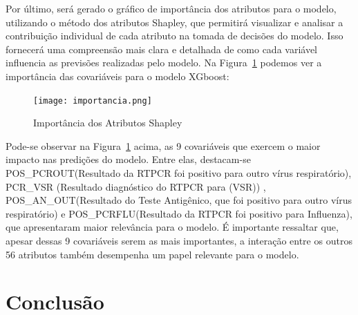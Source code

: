 \documentclass[12pt,oneside,a4paper,chapter=TITLE,
			   english,brazil]{abntex2}
\begin{document}
Por último, será gerado o gráfico de importância dos atributos para o modelo, utilizando o método dos atributos Shapley, que permitirá visualizar e analisar a contribuição individual de cada atributo na tomada de decisões do modelo. Isso fornecerá uma compreensão mais clara e detalhada de como cada variável influencia as previsões realizadas pelo modelo.  Na Figura~\ref{fig:Shaplay}  podemos ver a importância das covariáveis para o modelo XGboost:

 \begin{figure}[H]
  \centering

    \caption[Importância dos Atributos Shapley]{Importância dos Atributos Shapley} 
      \vspace{-0.75em}
  \texttt{[image: importancia.png]}

  \label{fig:Shaplay}
  \end{figure}
 \begin{flushleft}
\vspace{-1.9em}
\centering
{}
\end{flushleft}


 Pode-se observar na Figura~\ref{fig:Shaplay} acima, as 9 covariáveis que exercem o maior impacto nas predições do modelo. Entre elas, destacam-se POS\_PCROUT(Resultado da RTPCR foi positivo para outro vírus respiratório), PCR\_VSR (Resultado diagnóstico do RTPCR para (VSR))  , POS\_AN\_OUT(Resultado do Teste Antigênico, que foi positivo para outro vírus respiratório)  e  POS\_PCRFLU(Resultado da RTPCR foi positivo para Influenza), que apresentaram maior relevância para o modelo. É importante ressaltar que, apesar dessas 9 covariáveis serem as mais importantes, a interação entre os outros 56 atributos também desempenha um papel relevante para o  modelo.       



\chapter{Conclusão}
\end{document}

